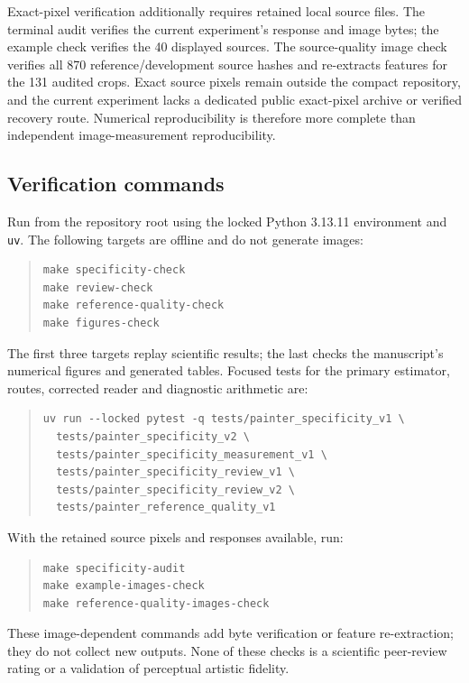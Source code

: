 Exact-pixel verification additionally requires retained local source files.
The terminal audit verifies the current experiment's response and image
bytes; the example check verifies the 40 displayed sources. The source-quality
image check verifies all 870 reference/development source hashes and
re-extracts features for the 131 audited crops. Exact source pixels remain
outside the compact repository, and the current experiment lacks a dedicated
public exact-pixel archive or verified recovery route. Numerical reproducibility
is therefore more complete than independent image-measurement reproducibility.

\subsection{Verification commands}
Run from the repository root using the locked Python 3.13.11 environment and
\texttt{uv}. The following targets are offline and do not generate images:
\begin{quote}\small
\begin{verbatim}
make specificity-check
make review-check
make reference-quality-check
make figures-check
\end{verbatim}
\end{quote}
The first three targets replay scientific results; the last checks the
manuscript's numerical figures and generated tables. Focused tests for the
primary estimator, routes, corrected reader and diagnostic arithmetic are:
\begin{quote}\small
\begin{verbatim}
uv run --locked pytest -q tests/painter_specificity_v1 \
  tests/painter_specificity_v2 \
  tests/painter_specificity_measurement_v1 \
  tests/painter_specificity_review_v1 \
  tests/painter_specificity_review_v2 \
  tests/painter_reference_quality_v1
\end{verbatim}
\end{quote}
With the retained source pixels and responses available, run:
\begin{quote}\small
\begin{verbatim}
make specificity-audit
make example-images-check
make reference-quality-images-check
\end{verbatim}
\end{quote}
These image-dependent commands add byte verification or feature re-extraction;
they do not collect new outputs. None of these checks is a scientific peer-review
rating or a validation of perceptual artistic fidelity.
